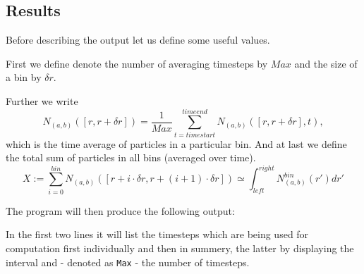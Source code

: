 \subsection{Results}

Before describing the output let us define some useful values.

First we define denote the number of averaging timesteps by $Max$ and the size of a bin by $\delta r$.

Further we write 
\begin{equation*}%
N_{(a, b)}([r, r+\delta r]) = \frac{1}{Max} \sum_{t = timestart}^{timeend} N_{(a,b)}([r, r+\delta r], t),
\end{equation*}
which is the time average of particles in a particular bin.
And at last we define the total sum of particles in all bins (averaged over time).
\begin{equation*} %
X := \sum_{i=0}^{bin} N_{(a, b)}([r + i\cdot \delta r, r+(i+1)\cdot \delta r]) \simeq \int_{left}^{right} N_{(a, b)}^{bin}(r')dr'
\end{equation*}


The program will then produce the following output: 

In the first two lines it will list the timesteps which are being used for computation first individually and then in summery, the latter by displaying the interval and - denoted as {\tt Max} - the number of timesteps.

